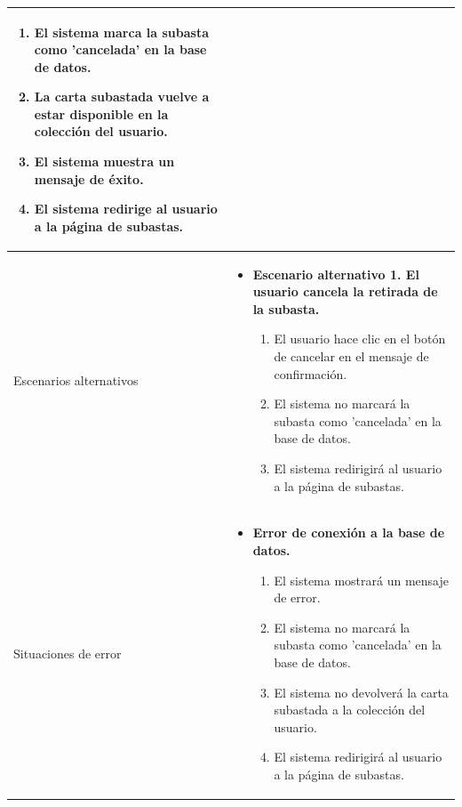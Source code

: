 \begin{longtable}{
    >{\columncolor{lightgreen!20}}p{4cm}
    p{12cm}
    }
\begin{enumerate}[nosep,leftmargin=*]
        \item El sistema marca la subasta como 'cancelada' en la base de datos.
        \item La carta subastada vuelve a estar disponible en la colección del usuario.
        \item El sistema muestra un mensaje de éxito.
        \item El sistema redirige al usuario a la página de subastas.
    \end{enumerate} \\
    \midrule
    Escenarios alternativos & 
    \begin{itemize}[nosep,leftmargin=*]
        \item \textbf{Escenario alternativo 1. El usuario cancela la retirada de la subasta.}
        \begin{enumerate}[nosep,leftmargin=*]
            \item El usuario hace clic en el botón de cancelar en el mensaje de confirmación.
            \item El sistema no marcará la subasta como 'cancelada' en la base de datos.
            \item El sistema redirigirá al usuario a la página de subastas.
        \end{enumerate}
    \end{itemize} \\
    \midrule
    Situaciones de error & 
    \begin{itemize}[nosep,leftmargin=*]
        \item \textbf{Error de conexión a la base de datos.}
        \begin{enumerate}[nosep,leftmargin=*]
            \item El sistema mostrará un mensaje de error.
            \item El sistema no marcará la subasta como 'cancelada' en la base de datos.
            \item El sistema no devolverá la carta subastada a la colección del usuario.
            \item El sistema redirigirá al usuario a la página de subastas.
        \end{enumerate}
    \end{itemize} \\
\end{longtable}




